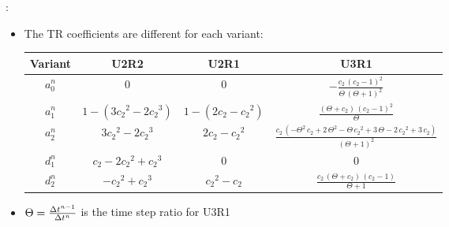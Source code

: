 \documentclass[aspectratio=169,serif]{beamer} %
\begin{document}
\begin{frame}{\secname: \subsecname}
  \begin{itemize}
    \item The TR coefficients are different for each variant:
          \begin{table}[htbp]
            \centering
            \footnotesize
            \begin{tabular}{|c|c|c|c|}
              \hline
              Variant & U2R2                          & U2R1                 & U3R1                                                                                                                                   \\
              \hline
              $a^n_0$ & 0                             & 0                    & $-\frac{c_{2}\,{\left(c_{2}-1\right)}^2}{\Theta\,{\left(\Theta+1\right)}^2}$                                                           \\
              \hline
              $a^n_1$ & $1-(3{c_2}^2 - 2 {c_2}^3)$    & $1-(2c_2 - {c_2}^2)$ & $\frac{\left(\Theta+c_{2}\right)\,{\left(c_{2}-1\right)}^2}{\Theta}$                                                                   \\
              \hline
              $a^n_2$ & $3{c_2}^2 - 2 {c_2}^3$        & $2c_2 - {c_2}^2$     & $\frac{c_{2}\,\left(-\Theta^2\,c_{2}+2\,\Theta^2-\Theta\,{c_{2}}^2+3\,\Theta-2\,{c_{2}}^2+3\,c_{2}\right)}{{\left(\Theta+1\right)}^2}$ \\
              \hline
              $d^n_1$ & ${c_2} - 2 {c_2}^2 + {c_2}^3$ & 0                    & 0                                                                                                                                      \\
              \hline
              $d^n_2$ & $- {c_2}^2 + {c_2}^3$         & ${c_2}^2 - {c_2}$    & $\frac{c_{2}\,\left(\Theta+c_{2}\right)\,\left(c_{2}-1\right)}{\Theta+1}$                                                              \\
              \hline
            \end{tabular}
            \label{tab:inter0Tab}
          \end{table}
    \item $\Theta=\frac{{\Delta} t^{n-1}}{{\Delta} t^n}$ is the
          time step ratio for U3R1
  \end{itemize}
\end{frame}
\end{document}
